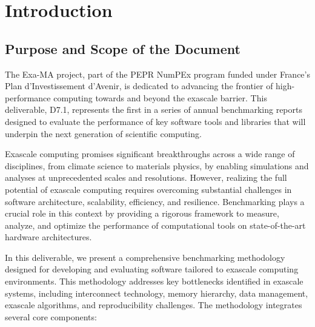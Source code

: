 
\clearpage
\section{Introduction}
\label{sec:introduction}


\subsection{Purpose and Scope of the Document}
\label{sec:purpose}


The Exa-MA project, part of the PEPR NumPEx program funded under France’s Plan d’Investissement d’Avenir, is dedicated to advancing the frontier of high-performance computing towards and beyond the exascale barrier. This deliverable, D7.1, represents the first in a series of annual benchmarking reports designed to evaluate the performance of key software tools and libraries that will underpin the next generation of scientific computing.

Exascale computing promises significant breakthroughs across a wide range of disciplines, from climate science to materials physics, by enabling simulations and analyses at unprecedented scales and resolutions. However, realizing the full potential of exascale computing requires overcoming substantial challenges in software architecture, scalability, efficiency, and resilience. Benchmarking plays a crucial role in this context by providing a rigorous framework to measure, analyze, and optimize the performance of computational tools on state-of-the-art hardware architectures.

In this deliverable, we present a comprehensive benchmarking methodology designed for developing and evaluating software tailored to exascale computing environments. This methodology addresses key bottlenecks identified in exascale systems, including interconnect technology, memory hierarchy, data management, exascale algorithms, and reproducibility challenges. The methodology integrates several core components:

